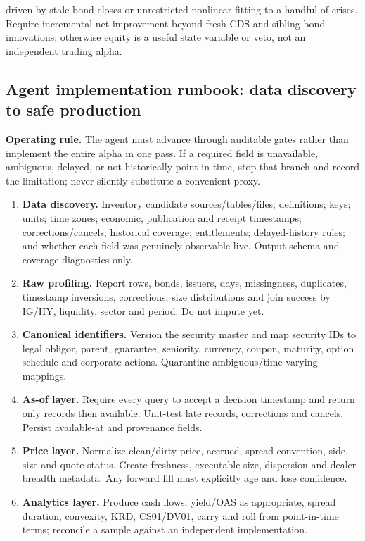 \documentclass[10pt]{article}
\begin{document}
driven by stale bond closes or unrestricted nonlinear fitting to a handful of crises. Require incremental net improvement beyond fresh CDS and sibling-bond innovations; otherwise equity is a useful state variable or veto, not an independent trading alpha.
\subsection{Agent implementation runbook: data discovery to safe production}
\textbf{Operating rule.} The agent must advance through auditable gates rather than implement the entire alpha in one pass. If a required field is unavailable, ambiguous, delayed, or not historically point-in-time, stop that branch and record the limitation; never silently substitute a convenient proxy.
\begin{enumerate}[leftmargin=2em,label=\textbf{A\arabic*.}]
\item \textbf{Data discovery.} Inventory candidate sources/tables/files; definitions; keys; units; time zones; economic, publication and receipt timestamps; corrections/cancels; historical coverage; entitlements; delayed-history rules; and whether each field was genuinely observable live. Output schema and coverage diagnostics only.
\item \textbf{Raw profiling.} Report rows, bonds, issuers, days, missingness, duplicates, timestamp inversions, corrections, size distributions and join success by IG/HY, liquidity, sector and period. Do not impute yet.
\item \textbf{Canonical identifiers.} Version the security master and map security IDs to legal obligor, parent, guarantee, seniority, currency, coupon, maturity, option schedule and corporate actions. Quarantine ambiguous/time-varying mappings.
\item \textbf{As-of layer.} Require every query to accept a decision timestamp and return only records then available. Unit-test late records, corrections and cancels. Persist available-at and provenance fields.
\item \textbf{Price layer.} Normalize clean/dirty price, accrued, spread convention, side, size and quote status. Create freshness, executable-size, dispersion and dealer-breadth metadata. Any forward fill must explicitly age and lose confidence.
\item \textbf{Analytics layer.} Produce cash flows, yield/OAS as appropriate, spread duration, convexity, KRD, CS01/DV01, carry and roll from point-in-time terms; reconcile a sample against an independent implementation.

\end{enumerate}
\end{document}

